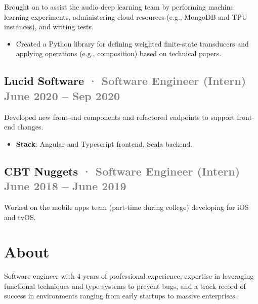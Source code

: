 \documentclass[10pt]{article} %
\providecommand{\tightlist}{%
  \setlength{\itemsep}{0pt}\setlength{\parskip}{0pt}}
\renewcommand{\emph}[1]{%
  \textcolor{gray}{#1}%
}
\begin{document}
\begin{paracol}{2}
Brought on to assist the audio deep learning team by performing machine
learning experiments, administering cloud resources (e.g., MongoDB and
TPU instances), and writing tests.

\begin{itemize}
\tightlist
\item
  Created a Python library for defining weighted finite-state
  transducers and applying operations (e.g., composition) based on
  technical papers.
\end{itemize}

\hypertarget{lucid-software-software-engineer-intern-june-2020-sep-2020}{%
\subsection{\texorpdfstring{Lucid Software \emph{· \small Software
Engineer (Intern) \hfill June 2020 -- Sep
2020}}{Lucid Software · Software Engineer (Intern) June 2020 -- Sep 2020}}\label{lucid-software-software-engineer-intern-june-2020-sep-2020}}

Developed new front-end components and refactored endpoints to support
front-end changes.

\begin{itemize}
\tightlist
\item
  \textbf{Stack}: Angular and Typescript frontend, Scala backend.
\end{itemize}

\hypertarget{cbt-nuggets-software-engineer-intern-june-2018-june-2019}{%
\subsection{\texorpdfstring{CBT Nuggets \emph{· \small Software Engineer
(Intern) \hfill June 2018 -- June
2019}}{CBT Nuggets · Software Engineer (Intern) June 2018 -- June 2019}}\label{cbt-nuggets-software-engineer-intern-june-2018-june-2019}}

Worked on the mobile apps team (part-time during college) developing for
iOS and tvOS.

\switchcolumn

\hypertarget{about}{%
\section{About}\label{about}}

Software engineer with 4 years of professional experience, expertise in
leveraging functional techniques and type systems to prevent bugs, and a
track record of success in environments ranging from early startups to
massive enterprises.


\end{paracol}
\end{document}

